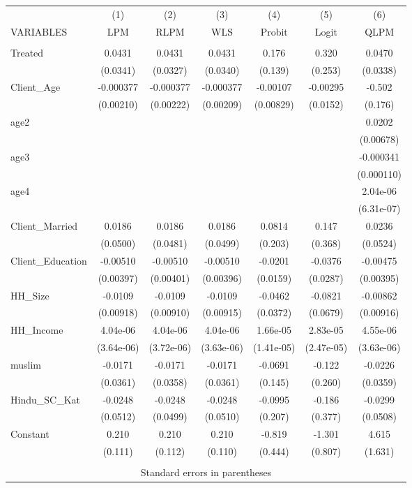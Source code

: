 \begin{tabular}{lcccccc} \hline
 & (1) & (2) & (3) & (4) & (5) & (6) \\
VARIABLES & LPM & RLPM & WLS & Probit & Logit & QLPM \\ \hline
 &  &  &  &  &  &  \\
Treated & 0.0431 & 0.0431 & 0.0431 & 0.176 & 0.320 & 0.0470 \\
 & (0.0341) & (0.0327) & (0.0340) & (0.139) & (0.253) & (0.0338) \\
Client\_Age & -0.000377 & -0.000377 & -0.000377 & -0.00107 & -0.00295 & -0.502 \\
 & (0.00210) & (0.00222) & (0.00209) & (0.00829) & (0.0152) & (0.176) \\
age2 &  &  &  &  &  & 0.0202 \\
 &  &  &  &  &  & (0.00678) \\
age3 &  &  &  &  &  & -0.000341 \\
 &  &  &  &  &  & (0.000110) \\
age4 &  &  &  &  &  & 2.04e-06 \\
 &  &  &  &  &  & (6.31e-07) \\
Client\_Married & 0.0186 & 0.0186 & 0.0186 & 0.0814 & 0.147 & 0.0236 \\
 & (0.0500) & (0.0481) & (0.0499) & (0.203) & (0.368) & (0.0524) \\
Client\_Education & -0.00510 & -0.00510 & -0.00510 & -0.0201 & -0.0376 & -0.00475 \\
 & (0.00397) & (0.00401) & (0.00396) & (0.0159) & (0.0287) & (0.00395) \\
HH\_Size & -0.0109 & -0.0109 & -0.0109 & -0.0462 & -0.0821 & -0.00862 \\
 & (0.00918) & (0.00910) & (0.00915) & (0.0372) & (0.0679) & (0.00916) \\
HH\_Income & 4.04e-06 & 4.04e-06 & 4.04e-06 & 1.66e-05 & 2.83e-05 & 4.55e-06 \\
 & (3.64e-06) & (3.72e-06) & (3.63e-06) & (1.41e-05) & (2.47e-05) & (3.63e-06) \\
muslim & -0.0171 & -0.0171 & -0.0171 & -0.0691 & -0.122 & -0.0226 \\
 & (0.0361) & (0.0358) & (0.0361) & (0.145) & (0.260) & (0.0359) \\
Hindu\_SC\_Kat & -0.0248 & -0.0248 & -0.0248 & -0.0995 & -0.186 & -0.0299 \\
 & (0.0512) & (0.0499) & (0.0510) & (0.207) & (0.377) & (0.0508) \\
Constant & 0.210 & 0.210 & 0.210 & -0.819 & -1.301 & 4.615 \\
 & (0.111) & (0.112) & (0.110) & (0.444) & (0.807) & (1.631) \\
 &  &  &  &  &  &  \\ \hline
\multicolumn{7}{c}{ Standard errors in parentheses} \\
\end{tabular}

